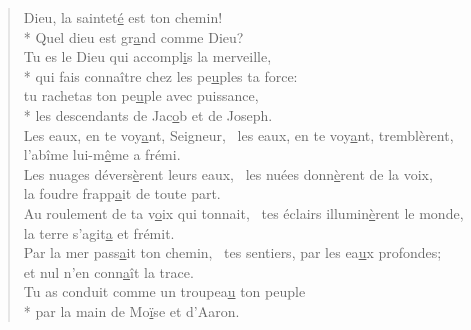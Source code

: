 \begin{verse}
Dieu, la saintet\underline{é} est ton chemin! \\*
Quel dieu est gr\underline{a}nd comme Dieu? \\

Tu es le Dieu qui accompl\underline{i}s la merveille, \\*
qui fais connaître chez les pe\underline{u}ples ta force: \\
tu rachetas ton pe\underline{u}ple avec puissance, \\*
les descendants de Jac\underline{o}b et de Joseph. \\

Les eaux, en te voy\underline{a}nt, Seigneur,~\psalmdagger
les eaux, en te voy\underline{a}nt, tremblèrent, \\
l’abîme lui-m\underline{ê}me a frémi. \\

Les nuages dévers\underline{è}rent leurs eaux,~\psalmdagger
les nuées donn\underline{è}rent de la voix, \\
la foudre frapp\underline{a}it de toute part. \\

Au roulement de ta v\underline{o}ix qui tonnait,~\psalmdagger
tes éclairs illumin\underline{è}rent le monde, \\
la terre s’agit\underline{a} et frémit. \\

Par la mer pass\underline{a}it ton chemin,~\psalmdagger
tes sentiers, par les ea\underline{u}x profondes; \\
et nul n’en conn\underline{a}ît la trace. \\

Tu as conduit comme un troupea\underline{u} ton peuple \\*
par la main de Mo\underline{ï}se et d’Aaron. \\
\end{verse}

